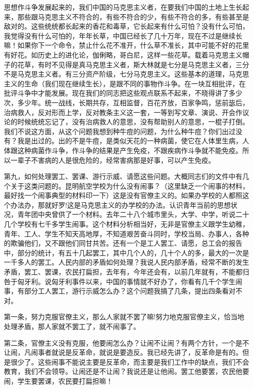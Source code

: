 思想作斗争发展起来的，我们中国的马克思主义者，在要我们中国的土地上生长起来，那些跟马克思主义不符合的，有些不符合的少，有些不符合的多，有些甚至是敌对的。这些统统都长起来的香花和毒草，它长起来有什么可怕？没有什么可怕，我觉得没有什么可怕的，年年长草，中国已经长了几十万年，现在不过是继续长嘛！如果你下一个命令，禁止什么花不准开，什么草不准长，其中可能不好的花里有好花。如历史上的进化论，伽俐略，哥白尼，这样一些花草。载着马克思主义帽子的花草，有时不见得是真马克思主义者，斯大林就是七分是马克思主义者，三分不是马克思主义者。有三分资产阶级，七分马克思主义。这些基本的道理，马克思主义的生命（我们现在继续生长），是跟不同的事物作斗争。在一块互相批评，在批评斗争中才能发展。现在我们的同志把这些观点联系不起来，不晓得讲了多少次，多少年。统一战线，长期共存，互相监督，百花齐放，百家争鸣，惩前毖后，治病救人，反对形而上学，反对教条主义这一套，一等到写文章、演说、开会作议论的时候统统忘记了，没有治病救人的意思，没有帮助别人的意思，一棍子打倒。我们不说这方面，从这个问题我想到种牛痘的问题，为什么种牛痘？你们出过没有？我是出过的。出的不是牛痘，是类似天花的一种病菌，使它在人体里生病，人体跟这种病菌作斗争，作斗争的结果是产生免疫，不跟疾病作斗争就不能免疫。所以一辈子不害病的人是很危险的，经常害病那是好事，可以产生免疫。

第九，如何处理罢工、罢课、游行示威、请愿这些问题。大概同志们的文件中有几个关于这类问题的。昆明航空学校为什么没有闹事？（这里缺乏一个闹事的材料，最好找一个闹事典型的材料印一下）这是没有官僚主义的。如果办学校的人都照这个办法办，那就好罗!这是马克思主义的办学校的办法。认识青年当前的思想状况，青年团中央曾供了一个材料。去年二十八个城市里头，大学、中学，听说二十几个学校有七千多学生闹事。这个材料分析相当好，无非是官僚主义跟学生幼稚，青年、工人、学生不知天高地厚，不知道艰苦奋斗同时，学校当局、办事人，各种的欺骗他们，又不跟他们同甘共苦。还有一个是工人罢工、请愿，总工会的报告中，部分的统计，有五十几起罢工，其中几个人的，几十个人的多，最大的一次是一千多人的罢工。人民内部的矛盾如何处理？我说人民内部矛盾，经常不断的发生矛盾，罢工、罢课，农民打扁担，去年有，今年还会有，以前几年就有，不能都归咎于匈牙利。说匈牙利事件以来，中国的事情就不好办了，你看有几千个学生闹事，有部分工人罢工，游行示威怎么办？这个问题我搞了几条，提出四条看对不对。

第一条，努力克服官僚主义，那么人家就不罢了嘛!努力地克服官僚主义，恰当地处理矛盾，那人家就不罢工了，就不闹事了。

第二条，官僚主义没有克服，他要闹怎么办？让闹不让闹？有两个方针，一个是不让闹，凡闹事者就说是反革命，就说是要造反。我已经先讲了，反革命是有的。但是很少了。这些闹事不能说主要是反革命，而主要是我们工作中的缺点，我们不会教育，我们不会领导。让闹还是不让闹？我说还是让他闹。罢工他要罢，农民他要闹，学生要罢课，农民要打扁担嘛！

